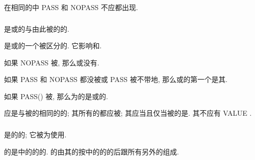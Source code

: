 在相同的\tit{\Procedure{}\Component{}\Attribute{}\Specifier{}\List{}}中 PASS 和 NOPASS 不应都出现.

\subsubsection{\PassedObjectDummyArgument{}}

\PassedObjectDummyArgument{}是\TypeBoundProcedure{}或\Procedure{}\Pointer{}\Component{}的与\Procedure{}由此被\Invoke{}的\Object{}\Associate{}的\DummyArgument{}.

\PassedObjectDummyArgument{}是\Procedure{}\Pointer{}\Component{}或\TypeBoundProcedure{}的一个被区分的\DummyArgument{}. 它影响\Procedure{}\Override{}和\ArgumentAssociation{}.

如果 NOPASS 被\Specify{}, 那么\Procedure{}\Pointer{}\Component{}或\TypeBoundProcedure{}没有\PassedObjectDummyArgument{}.

如果 PASS 和 NOPASS 都没被\Specify{}或 PASS 被不带\tit{\Argument{}\Name{}}地\Specify{}, 那么\Procedure{}\Pointer{}\Component{}或\TypeBoundProcedure{}的第一个\DummyArgument{}是其\PassedObjectDummyArgument{}.

如果 PASS(\tit{\Argument{}\Name{}}) 被\Specify{}, 那么\Name{}为\tit{\Argument{}\Name{}}的\DummyArgument{}是\Procedure{}\Pointer{}\Component{}或\Named{}\TypeBoundProcedure{}的\PassedObjectDummyArgument{}.

\PassedObjectDummyArgument{}应是与被\Define{}的\Type{}相同的的\Scalar{}\Nonpointer{}\Nonallocatable{}\Dummy{}\Data{}\Object{}; 其所有的\Length{}\TypeParameter{}都应被\Assume{}; 其应\Polymorphic{}当且仅当被\Define{}的\Type{}是\ExtensibleType{}. 其不应有 VALUE \Attribute{}.

\subsubsection{\Component{}\Order{}}

\TypeParameter{}\Order{}是\DerivedType{}的\TypeParameter{}的\Order{}; 它被为\DerivedType{}\Specifier{}使用.

\Nonextended{}\Type{}的\Component{}\Order{}是\DerivedType{}\Definition{}中的\Component{}的\Declaration{}的\Order{}. \Extended{}\Type{}的\Component{}\Order{}由其\Parent{}\Type{}的\Component{}\Order{}按\DerivedType{}\Definition{}中的\Component{}的\Declaration{}的\Order{}后跟所有另外的\Component{}组成.
